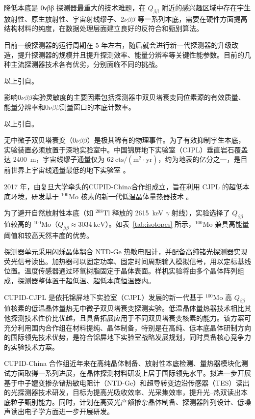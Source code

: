 \documentclass[type=master]{fduthesis}
\begin{document}
降低本底是 0νββ 探测器最重大的技术难题，在 $Q_{\beta\beta}$ 附近的感兴趣区域中存在宇生放射性、原生放射性、宇宙射线缪子、2$\nu\beta\beta$ 等一系列本底，需要在硬件方面提高结构材料的纯度，在数据处理层面建立良好的反符合和甄别算法。

目前一般探测器的运行周期在 5 年左右，随后就会进行新一代探测器的升级改造，提升探测器的规模并且提升探测效率、能量分辨率等关键性能参数。目前的几种主流探测器技术各有优劣，分别面临不同的挑战。

{\color{red} 以上引自}\cite{Wang2025}。

影响$0\nu\beta\beta$实验灵敏度的主要因素包括探测器中双贝塔衰变同位素源的有效质量、能量分辨率和$0\nu\beta\beta$测量窗口的本底计数率。

{\color{green} 以上引自}\cite{Ma2020Majorana}。



无中微子双贝塔衰变（$0\nu\beta\beta$）是极其稀有的物理事件。为了有效抑制宇生本底，实验装置必须放置于深地实验室中。中国锦屏地下实验室（CJPL）垂直岩石覆盖达 2400~m，宇宙线缪子通量仅为 $62~\text{cts}/(\text{m}^2 \cdot \text{yr})$，约为地表的亿分之一，是目前世界上宇宙线通量最低的地下实验室 \cite{Wu2013CJPL}。

2017 年，由复旦大学牵头的CUPID-China合作组成立，旨在利用 CJPL 的超低本底环境，研发基于 $^{100}\text{Mo}$ 核素的新一代低温晶体量热器技术 \cite{Chen2023Sim, Chen2022Cosmo}。

为了避开自然放射性本底（如 $^{208}\text{Tl}$ 释放的 2615~keV $\gamma$ 射线），实验选择了 $Q_{\beta\beta}$ 值较高的 $^{100}\text{Mo}$（$Q_{\beta\beta} \approx 3034~\text{keV}$）。如表~\ref{tab:isotopes} 所示，$^{100}\text{Mo}$ 兼具高能量阈值和较高天然丰度的优势。

探测器单元采用闪烁晶体耦合 NTD-Ge 热敏电阻计，并配备高纯锗光探测器实现荧光信号读出。加热器可以固定功率、固定时间周期输入模拟信号，用以定标基线位置。温度传感器通过环氧树脂固定于晶体表面。样机实验将由多个晶体阵列组成，探测器整体置于超低温、超低本底恒温器内。


CUPID-CJPL 是依托锦屏地下实验室（CJPL）发展的新一代基于 $^{100}\text{Mo}$ 高 $Q_{\beta\beta}$ 值核素的低温晶体量热无中微子双贝塔衰变探测实验。低温晶体量热器技术相比其他探测技术性价比优越，且具备拓展应用于不同双贝塔衰变核素的能力。该方案可充分利用国内合作组在材料提纯、晶体制备，特别是在高纯、低本底晶体研制方向的国际领先技术优势，是符合锦屏地下实验室战略发展规划，同时具备核心竞争力的实验技术方案。

CUPID-China 合作组近年来在高纯晶体制备、放射性本底检测、量热器模块化测试方面取得一系列进展，在晶体探测材料研发上居于国际领先水平。拟进一步开展基于中子嬗变掺杂锗热敏电阻计（NTD-Ge）和超导转变边沿传感器（TES）读出的光探测器技术研发，目标为提高光吸收效率、光采集效率，提升光--热双读出本底粒子甄别能力。同时，计划在高荧光产额掺杂晶体制备、探测器阵列设计、低噪声读出电子学方面进一步开展研发。
\end{document}
